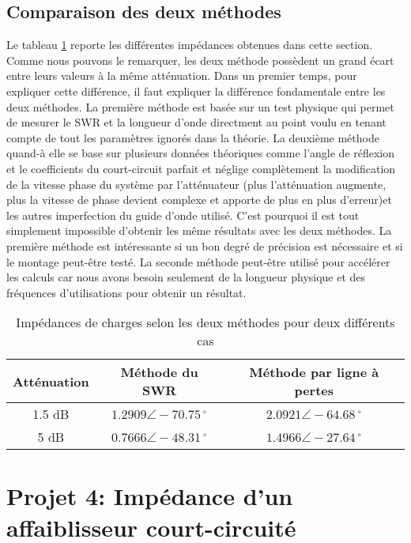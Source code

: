 \subsection{Comparaison des deux méthodes}
Le tableau \ref{tab:4} reporte les différentes impédances obtenues dans cette section. Comme nous pouvons le remarquer, les deux méthode possèdent un grand écart entre leurs valeurs à la même atténuation. Dans un premier temps, pour expliquer cette différence, il faut expliquer la différence fondamentale entre les deux méthodes. La première méthode est basée sur un test physique qui permet de mesurer le SWR et la longueur d'onde directment au point voulu en tenant compte de tout les paramètres ignorés dans la théorie. La deuxième méthode quand-à elle se base sur plusieurs données théoriques comme l'angle de réflexion et le coefficients du court-circuit parfait et néglige complètement la modification de la vitesse phase du système par l'atténuateur (plus l'atténuation augmente, plus la vitesse de phase devient complexe et apporte de plus en plus d'erreur)et les autres imperfection du guide d'onde utilisé. C'est pourquoi il est tout simplement impossible d'obtenir les même résultats avec les deux méthodes. La première méthode est intéressante si un bon degré de précision est nécessaire et si le montage peut-être testé. La seconde méthode peut-être utilisé pour accélérer les calculs car nous avons besoin seulement de la longueur physique et des fréquences d'utilisations pour obtenir un résultat.

  \begin{table}[htbp]
    \centering
    \begin{tabular}{|c||c|c|} \hline
    Atténuation & Méthode du SWR & Méthode par ligne à pertes \\ \hline  \hline
    1.5 dB & $1.2909 \angle -70.75\,^{\circ}$ & $2.0921 \angle -64.68\,^{\circ}$ \\
    5 dB   & $0.7666 \angle -48.31\,^{\circ}$ & $1.4966 \angle -27.64\,^{\circ}$ \\ \hline
    \end{tabular}%
        \caption{Impédances de charges selon les deux méthodes pour deux différents cas}
    \label{tab:4}%
\end{table}%

\section{Projet 4: Impédance d'un affaiblisseur court-circuité}